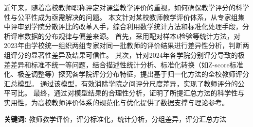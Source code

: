 \begin{summary}
    近年来，随着高校教师职称评定对课堂教学评价的重视，如何确保教学评分的科学性与公平性成为亟需解决的问题。
    本文针对某校教师教学评价体系，从专家组集中评审到学院分散评比的改革入手，综合利用数学统计方法和标准化处理手段，分析评审数据的分布规律与偏差来源。
    首先，采用配对样本t检验等统计方法，对2023年由学校统一组织两组专家对同一批教师的评价结果进行差异性分析，判断两组评分的显著性差异及结果可信性。
    其次，针对2024年各学院分别评分导致的极差差异和标准不统一等问题，结合描述性统计分析、标准化转换（如Z-score标准化、极差调整等）探究各学院评分分布特征，提出基于归一化方法的全校教师评分汇总模型。
    通过该模型，有效消除学院之间评分尺度差异，实现了教师评分的公平可比。
    最终，通过对模型结果的合理性分析，证明了所提汇总方法的科学性与实用性，为高校教师评价体系的规范化与优化提供了数据支撑与理论参考。
    \vspace{0.5cm}

    \textbf{关键词:} 教师教学评价，评分标准化，统计分析，分组差异，评分汇总方法
\end{summary}
    